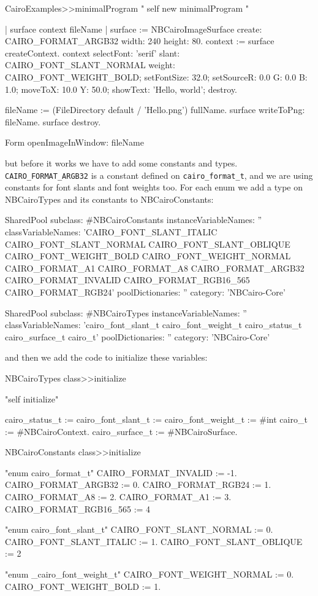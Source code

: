 \documentclass[a4paper,10pt,twoside]{book}
\begin{document}
\begin{code}{}
CairoExamples>>minimalProgram
	"
	self new minimalProgram
	"
	
	| surface context fileName |
	surface := NBCairoImageSurface create: CAIRO_FORMAT_ARGB32 width: 240 height: 80.
	context := surface createContext.
	context selectFont: 'serif' slant: CAIRO_FONT_SLANT_NORMAL weight: CAIRO_FONT_WEIGHT_BOLD;
			setFontSize: 32.0;
			setSourceR: 0.0 G: 0.0 B: 1.0;
			moveToX: 10.0 Y: 50.0;
			showText: 'Hello, world';
			destroy.
	
	fileName := (FileDirectory default / 'Hello.png') fullName.
	surface writeToPng: fileName.
	surface destroy.

	Form openImageInWindow: fileName
\end{code}


but before it works we have to add some constants and types.
\verb|CAIRO_FORMAT_ARGB32| is a constant defined on
\verb|cairo_format_t|, and we are using constants for
font slants and font weights too. For each enum we add
a type on NBCairoTypes and its constants to NBCairoConstants:

\begin{code}
SharedPool subclass: #NBCairoConstants
	instanceVariableNames: ''
	classVariableNames: 'CAIRO_FONT_SLANT_ITALIC CAIRO_FONT_SLANT_NORMAL CAIRO_FONT_SLANT_OBLIQUE CAIRO_FONT_WEIGHT_BOLD CAIRO_FONT_WEIGHT_NORMAL CAIRO_FORMAT_A1 CAIRO_FORMAT_A8 CAIRO_FORMAT_ARGB32 CAIRO_FORMAT_INVALID CAIRO_FORMAT_RGB16_565 CAIRO_FORMAT_RGB24'
	poolDictionaries: ''
	category: 'NBCairo-Core'

SharedPool subclass: #NBCairoTypes
	instanceVariableNames: ''
	classVariableNames: 'cairo_font_slant_t cairo_font_weight_t cairo_status_t cairo_surface_t cairo_t'
	poolDictionaries: ''
	category: 'NBCairo-Core'
\end{code}

and then we add the code to initialize these variables:

\begin{code}{}
NBCairoTypes class>>initialize

    "self initialize"
	
    cairo_status_t := cairo_font_slant_t := cairo_font_weight_t := #int
    cairo_t := #NBCairoContext.
    cairo_surface_t  := #NBCairoSurface.


NBCairoConstants class>>initialize

	"enum cairo_format_t"
	CAIRO_FORMAT_INVALID :=  -1.
	CAIRO_FORMAT_ARGB32 :=  0.
	CAIRO_FORMAT_RGB24 := 1.
	CAIRO_FORMAT_A8 := 2.
	CAIRO_FORMAT_A1 := 3.
	CAIRO_FORMAT_RGB16_565 := 4
	
	"enum cairo_font_slant_t"
    CAIRO_FONT_SLANT_NORMAL := 0.
    CAIRO_FONT_SLANT_ITALIC := 1.
    CAIRO_FONT_SLANT_OBLIQUE := 2
    
	"enum _cairo_font_weight_t"
    CAIRO_FONT_WEIGHT_NORMAL := 0.
    CAIRO_FONT_WEIGHT_BOLD := 1.
\end{code}
\end{document}
